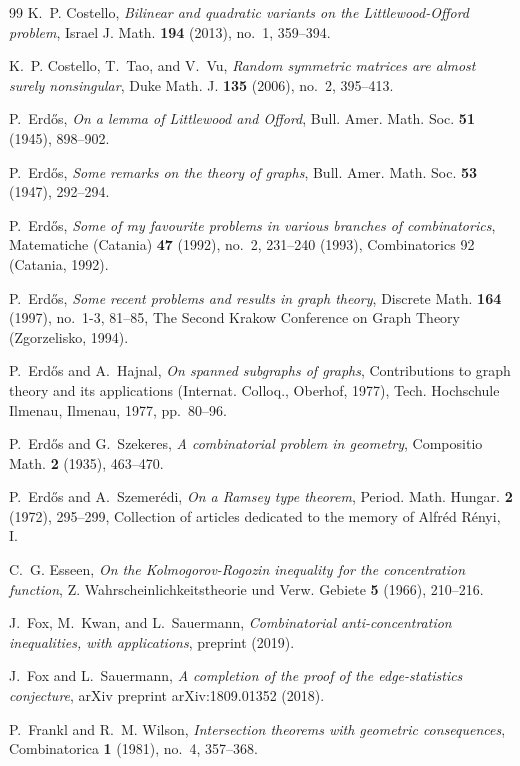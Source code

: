 \documentclass{daj}
\theoremstyle{plain}
\theoremstyle{plain}
\theoremstyle{plain}
\theoremstyle{plain}
\theoremstyle{definition}
\theoremstyle{plain}
\theoremstyle{plain}
\theoremstyle{definition}
\theoremstyle{definition}
\theoremstyle{plain}
\begin{document}
\begin{thebibliography}{99}
K.~P. Costello, \emph{Bilinear and quadratic variants on the
  {L}ittlewood-{O}fford problem}, Israel J. Math. \textbf{194} (2013), no.~1,
  359--394.

K.~P. Costello, T.~Tao, and V.~Vu, \emph{Random symmetric matrices are almost
  surely nonsingular}, Duke Math. J. \textbf{135} (2006), no.~2, 395--413.

P.~Erd{\H{o}}s, \emph{On a lemma of {L}ittlewood and {O}fford}, Bull. Amer.
  Math. Soc. \textbf{51} (1945), 898--902.

P.~Erd{\H o}s, \emph{Some remarks on the theory of graphs}, Bull. Amer. Math.
  Soc. \textbf{53} (1947), 292--294.

P.~Erd{\H o}s, \emph{Some of my favourite problems in various branches of
  combinatorics}, Matematiche (Catania) \textbf{47} (1992), no.~2, 231--240
  (1993), Combinatorics 92 (Catania, 1992).

P.~Erd{\H o}s, \emph{Some recent problems and results in graph theory},
  Discrete Math. \textbf{164} (1997), no.~1-3, 81--85, The Second Krakow
  Conference on Graph Theory (Zgorzelisko, 1994).

P.~Erd{\H o}s and A.~Hajnal, \emph{On spanned subgraphs of graphs},
  Contributions to graph theory and its applications ({I}nternat. {C}olloq.,
  {O}berhof, 1977), Tech. Hochschule Ilmenau, Ilmenau, 1977, pp.~80--96.

P.~Erd{\H o}s and G.~Szekeres, \emph{A combinatorial problem in geometry},
  Compositio Math. \textbf{2} (1935), 463--470.

P.~Erd{\H o}s and A.~Szemer\'edi, \emph{On a {R}amsey type theorem}, Period.
  Math. Hungar. \textbf{2} (1972), 295--299, Collection of articles dedicated
  to the memory of Alfr\'ed R\'enyi, I.

C.~G. Esseen, \emph{On the {K}olmogorov-{R}ogozin inequality for the
  concentration function}, Z. Wahrscheinlichkeitstheorie und Verw. Gebiete
  \textbf{5} (1966), 210--216.

J.~Fox, M.~Kwan, and L.~Sauermann, \emph{Combinatorial anti-concentration
  inequalities, with applications}, preprint (2019).

J.~Fox and L.~Sauermann, \emph{A completion of the proof of the edge-statistics
  conjecture}, arXiv preprint arXiv:1809.01352 (2018).

P.~Frankl and R.~M. Wilson, \emph{Intersection theorems with geometric
  consequences}, Combinatorica \textbf{1} (1981), no.~4, 357--368.


\end{thebibliography}
\end{document}
